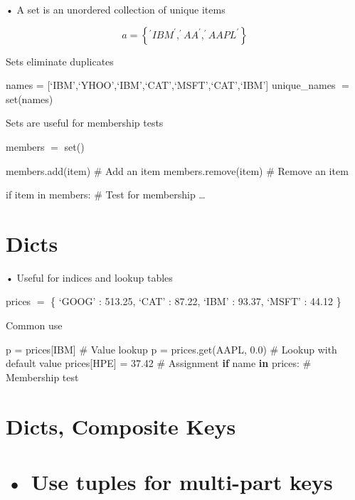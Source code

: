 \documentclass[
  letterpaper,
  DIV=11,
  numbers=noendperiod]{scrreprt}
\newenvironment{Shaded}{\begin{snugshade}}{\end{snugshade}}
\newcommand{\CommentTok}[1]{\textcolor[rgb]{0.37,0.37,0.37}{#1}}
\newcommand{\ControlFlowTok}[1]{\textcolor[rgb]{0.00,0.23,0.31}{\textbf{#1}}}
\newcommand{\FloatTok}[1]{\textcolor[rgb]{0.68,0.00,0.00}{#1}}
\newcommand{\KeywordTok}[1]{\textcolor[rgb]{0.00,0.23,0.31}{\textbf{#1}}}
\newcommand{\NormalTok}[1]{\textcolor[rgb]{0.00,0.23,0.31}{#1}}
\newcommand{\OperatorTok}[1]{\textcolor[rgb]{0.37,0.37,0.37}{#1}}
\newcommand{\StringTok}[1]{\textcolor[rgb]{0.13,0.47,0.30}{#1}}
\begin{document}
• A set is an unordered collection of unique items

\[
a = \left\{^ {\prime} I B M ^ {\prime}, ^ {\prime} A A ^ {\prime}, ^ {\prime} A A P L ^ {\prime} \right\}
\]

Sets eliminate duplicates

names = {[}`IBM',`YHOO',`IBM',`CAT',`MSFT',`CAT',`IBM'{]} unique\_names
\(=\) set(names)

Sets are useful for membership tests

members \(=\) set()

members.add(item) \# Add an item members.remove(item) \# Remove an item

if item in members: \# Test for membership \ldots{}


\chapter{Dicts}\label{dicts}

• Useful for indices and lookup tables

prices \(=\) \{ `GOOG' : 513.25, `CAT' : 87.22, `IBM' : 93.37, `MSFT' :
44.12 \}

Common use

\begin{Shaded}
\begin{Highlighting}[]
\NormalTok{p }\OperatorTok{=}\NormalTok{ prices[}\StringTok{\textquotesingle{}IBM\textquotesingle{}}\NormalTok{] }\CommentTok{\# Value lookup  }
\NormalTok{p }\OperatorTok{=}\NormalTok{ prices.get(}\StringTok{\textquotesingle{}AAPL\textquotesingle{}}\NormalTok{, }\FloatTok{0.0}\NormalTok{) }\CommentTok{\# Lookup with default value  }
\NormalTok{prices[}\StringTok{\textquotesingle{}HPE\textquotesingle{}}\NormalTok{] }\OperatorTok{=} \FloatTok{37.42} \CommentTok{\# Assignment  }
\ControlFlowTok{if}\NormalTok{ name }\KeywordTok{in}\NormalTok{ prices: }\CommentTok{\# Membership test }
\end{Highlighting}
\end{Shaded}


\chapter{Dicts, Composite Keys}\label{dicts-composite-keys}


\chapter{• Use tuples for multi-part
keys}\label{use-tuples-for-multi-part-keys}
\end{document}
